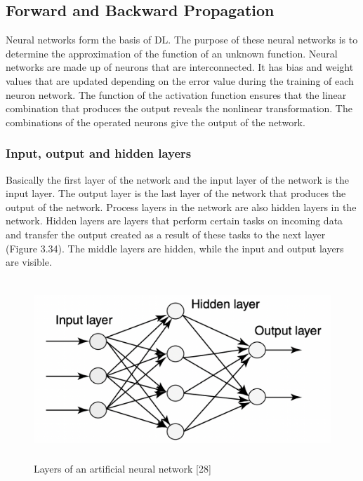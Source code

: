 \documentclass[12pt,twoside,a4]{mwbk}
\begin{document}
\subsection{Forward and Backward Propagation}
Neural networks form the basis of DL. The purpose of these neural networks is to determine the approximation of the function of an unknown function. Neural networks are made up of neurons that are interconnected. It has bias and weight values that are updated depending on the error value during the training of each neuron network. The function of the activation function ensures that the linear combination that produces the output reveals the nonlinear transformation. The combinations of the operated neurons give the output of the network.

\subsubsection{Input, output and hidden layers}
Basically the first layer of the network and the input layer of the network is the input layer. The output layer is the last layer of the network that produces the output of the network. Process layers in the network are also hidden layers in the network. Hidden layers are layers that perform certain tasks on incoming data and transfer the output created as a result of these tasks to the next layer (Figure 3.34). The middle layers are hidden, while the input and output layers are visible.
\begin{figure}[h]
    \centering
    \includegraphics[width=13.6cm, height=6.8cm]{MLP.png}
    \caption{Layers of an artificial neural network [28]}
\end{figure}
\end{document}
